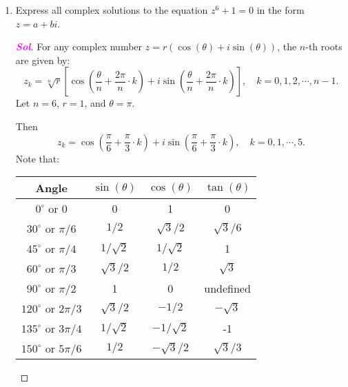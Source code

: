 \documentclass{article}
\theoremstyle{definition}
\newcommand{\of}[1]{\left( #1 \right)}
\newcommand{\sol}{\textcolor{magenta}{\bf Sol}}
\renewcommand{\Re}{\operatorname{Re}}
\renewcommand{\Im}{\operatorname{Im}}
\begin{document}
\begin{enumerate}
	\item  Express all complex solutions to the equation $z^6 + 1 = 0$ in the form $z = a + bi$.
	\begin{proof}[\sol]
		For any complex number $z = r(\cos(\theta) + i\sin(\theta))$, the $n$-th roots are given by: \[
		z_k=\sqrt[n]{r}\left[\cos\of{\frac{\theta}{n}+\frac{2\pi}{n}\cdot k}+i\sin\of{\frac{\theta}{n}+\frac{2\pi}{n}\cdot k}\right],\quad k=0,1,2,\cdots,n-1.
		\] Let $n=6$, $r=1$, and $\theta = \pi$.
		\iffalse
		because \begin{center}
			\begin{center}
				\begin{tikzpicture}
					\draw[thick,->] (-1.5,0) -- (1.5,0) node[below] {$\Re$};
					\draw[thick,->] (0,-1.5) -- (0,1.5) node[left] {$\Im$};
					
					\draw[dashed, thick, red] (0,0) -- (-1,0) node[midway, above, black] {$1$};
					\draw[fill, red] (-1,0) circle (1.5pt) node[below left] {$-1$};
					\draw[->, thick, orange] (0.3,0) arc (0:180:0.3) node[midway, right, black] {$\pi$};
					\draw (0,0) circle (1);
				\end{tikzpicture}
			\end{center}
		\end{center}
		\fi
		Then \[
		z_k=\cos\of{\frac{\pi}{6}+\frac{\pi}{3}\cdot k}+i\sin\of{\frac{\pi}{6}+\frac{\pi}{3}\cdot k},\quad k=0,1,\cdots, 5.
		\]
		Note that: \begin{table}[ht!]
			\centering
			\begin{tabular}{c||c|c|c}
				\toprule
				Angle & $\sin(\theta)$ & $\cos(\theta)$ & $\tan(\theta)$ \\
				\midrule
				$0^\circ$ or $0$ & 0 & 1 & 0 \\
				$30^\circ$ or ${\pi}/{6}$ & ${1}/{2}$ & ${\sqrt{3}}/{2}$ & ${\sqrt{3}}/{6}$ \\
				$45^\circ$ or ${\pi}/{4}$ & ${1}/{\sqrt{2}}$ & ${1}/{\sqrt{2}}$ & 1 \\
				$60^\circ$ or ${\pi}/{3}$ & ${\sqrt{3}}/{2}$ & ${1}/{2}$ & $\sqrt{3}$ \\
				$90^\circ$ or ${\pi}/{2}$ & 1 & 0 & undefined \\
				$120^\circ$ or ${2\pi}/{3}$ & ${\sqrt{3}}/{2}$ & $-{1}/{2}$ & $-\sqrt{3}$ \\
				$135^\circ$ or ${3\pi}/{4}$ & ${1}/{\sqrt{2}}$ & $-{1}/{\sqrt{2}}$ & -1 \\
				$150^\circ$ or ${5\pi}/{6}$ & ${1}/{2}$ & $-{\sqrt{3}}/{2}$ & ${\sqrt{3}}/{3}$ \\

\end{tabular}
\end{table}
\end{proof}
\end{enumerate}
\end{document}
